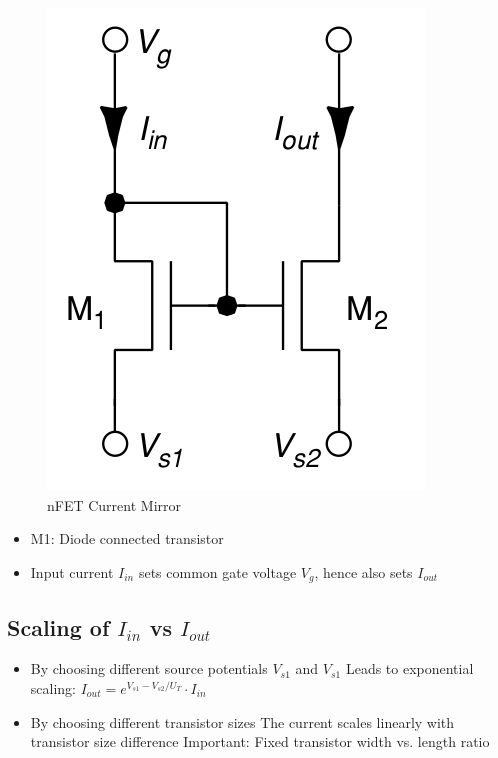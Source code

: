 \begin{figure}[htbp]
  \centering
  \includegraphics[scale=1]{pics/current_mirror_vlsi.png}
  \caption{nFET Current Mirror \cite{book:VLSI}}
  \label{fig:nFET_Current_Mirror}
\end{figure}\bigskip

\begin{itemize}
\item M1: Diode connected transistor
\item Input current $I_{in}$ sets common gate voltage $V_g$, hence also sets $I_{out}$
\end{itemize}

\subsection{Scaling of $I_{in}$ vs $I_{out}$}
\begin{itemize}
\item By choosing different source potentials $V_{s1}$ and $V_{s1}$
\subitem Leads to exponential scaling: $I_{out}=e^{V_{s1}-V_{s2}/U_T} \cdot I_{in}$
\item By choosing different transistor sizes
\subitem The current scales linearly with transistor size difference 
\subitem Important: Fixed transistor width vs. length ratio
\end{itemize}

